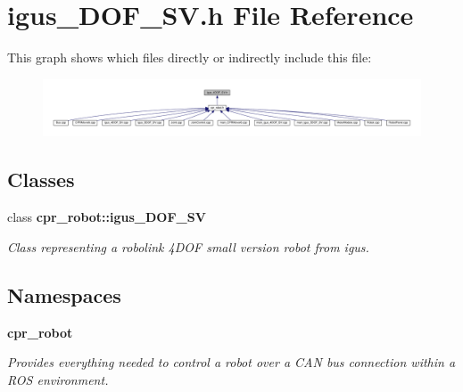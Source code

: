 \section{igus\+\_\+D\+O\+F\+\_\+\+S\+V.\+h File Reference}
\label{igus__4DOF__SV_8h}
This graph shows which files directly or indirectly include this file\+:
\nopagebreak
\begin{figure}[H]
\begin{center}
\leavevmode
\includegraphics[width=350pt]{igus__4DOF__SV_8h__dep__incl}
\end{center}
\end{figure}
\subsection*{Classes}
\begin{DoxyCompactItemize}
\item 
class \textbf{ cpr\+\_\+robot\+::igus\+\_\+D\+O\+F\+\_\+\+SV}
\begin{DoxyCompactList}\small\item\em Class representing a robolink 4\+D\+OF small version robot from igus. \end{DoxyCompactList}\end{DoxyCompactItemize}
\subsection*{Namespaces}
\begin{DoxyCompactItemize}
\item 
 \textbf{ cpr\+\_\+robot}
\begin{DoxyCompactList}\small\item\em Provides everything needed to control a robot over a C\+AN bus connection within a R\+OS environment. \end{DoxyCompactList}\end{DoxyCompactItemize}
